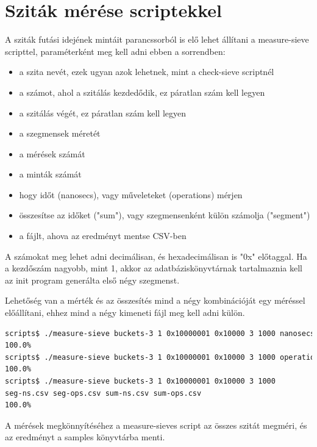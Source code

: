 \documentclass[12pt]{report}
\begin{document}
\section{Sziták mérése scriptekkel}

A sziták futási idejének mintáit parancssorból is elő lehet állítani
a measure-sieve scripttel, paraméterként meg kell adni ebben a sorrendben:

\begin{itemize}
\item a szita nevét, ezek ugyan azok lehetnek, mint a check-sieve scriptnél
\item a számot, ahol a szitálás kezdedődik, ez páratlan szám kell legyen
\item a szitálás végét, ez páratlan szám kell legyen
\item a szegmensek méretét
\item a mérések számát
\item a minták számát
\item hogy időt (nanosecs), vagy műveleteket (operations) mérjen
\item összesítse az időket ("sum"), vagy szegmensenként külön számolja ("segment")
\item a fájlt, ahova az eredményt mentse CSV-ben
\end{itemize}

A számokat meg lehet adni decimálisan, és hexadecimálisan is "0x" előtaggal.
Ha a kezdőszám nagyobb, mint 1, akkor az adatbáziskönyvtárnak tartalmaznia
kell az init program generálta első négy szegmenst.

Lehetőség van a mérték és az összesítés mind a négy kombinációját egy
méréssel előállítani, ehhez mind a négy kimeneti fájl meg kell adni külön.

{\tiny
\begin{lstlisting}[language=bash]
scripts$ ./measure-sieve buckets-3 1 0x10000001 0x10000 3 1000 nanosecs sum out1.csv
100.0%
scripts$ ./measure-sieve buckets-3 1 0x10000001 0x10000 3 1000 operations segment out2.csv
100.0%
scripts$ ./measure-sieve buckets-3 1 0x10000001 0x10000 3 1000
seg-ns.csv seg-ops.csv sum-ns.csv sum-ops.csv
100.0%
\end{lstlisting}
}

A mérések megkönnyítéséhez a measure-sieves script az összes szitát megméri,
és az eredményt a samples könyvtárba menti.
\end{document}
